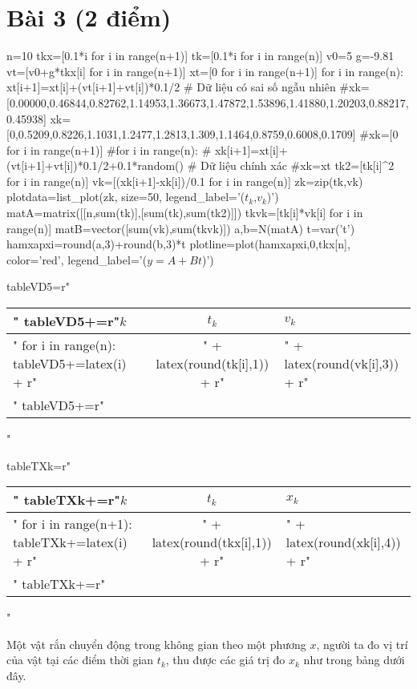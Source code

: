 \documentclass[12pt]{article}
\begin{document}
\section{Bài 3 (2 điểm)}


\begin{sagesilent}
n=10
tkx=[0.1*i for i in range(n+1)]
tk=[0.1*i for i in range(n)]
v0=5
g=-9.81
vt=[v0+g*tkx[i] for i in range(n+1)]
xt=[0 for i in range(n+1)]
for i in range(n):
 xt[i+1]=xt[i]+(vt[i+1]+vt[i])*0.1/2
# Dữ liệu có sai số ngẫu nhiên
#xk=[0.00000,0.46844,0.82762,1.14953,1.36673,1.47872,1.53896,1.41880,1.20203,0.88217,0.45938]
xk=[0,0.5209,0.8226,1.1031,1.2477,1.2813,1.309,1.1464,0.8759,0.6008,0.1709]
#xk=[0 for i in range(n+1)]
#for i in range(n):
# xk[i+1]=xt[i]+(vt[i+1]+vt[i])*0.1/2+0.1*random()
# Dữ liệu chính xác
#xk=xt
tk2=[tk[i]^2 for i in range(n)]
vk=[(xk[i+1]-xk[i])/0.1 for i in range(n)]
zk=zip(tk,vk)
plotdata=list_plot(zk, size=50, legend_label='($t_k$,$v_k$)')
matA=matrix([[n,sum(tk)],[sum(tk),sum(tk2)]])
tkvk=[tk[i]*vk[i] for i in range(n)]
matB=vector([sum(vk),sum(tkvk)])
a,b=N(matA\matB)
t=var('t')
hamxapxi=round(a,3)+round(b,3)*t
plotline=plot(hamxapxi,0,tkx[n], color='red', legend_label='($y=A+Bt$)')

tableVD5=r"\begin{tabular}{l|c|l}"
tableVD5+=r"$k$ & $t_k$ & $v_k$ \\ \hline"
for i in range(n):
  tableVD5+=latex(i) + r"&" + latex(round(tk[i],1)) + r"&" + latex(round(vk[i],3)) + r"\\"
tableVD5+=r"\end{tabular}"

tableTXk=r"\begin{tabular}{l|c|l}"
tableTXk+=r"$k$ & $t_k$ & $x_k$ \\ \hline"
for i in range(n+1):
  tableTXk+=latex(i) + r"&" + latex(round(tkx[i],1)) + r"&" + latex(round(xk[i],4)) + r"\\"
tableTXk+=r"\end{tabular}"

\end{sagesilent}

Một vật rắn chuyển động trong không gian theo một phương $x$, người ta đo vị trí của vật tại các điểm thời gian $t_k$, thu được các giá trị đo $x_k$ như trong bảng dưới đây.
\end{document}
